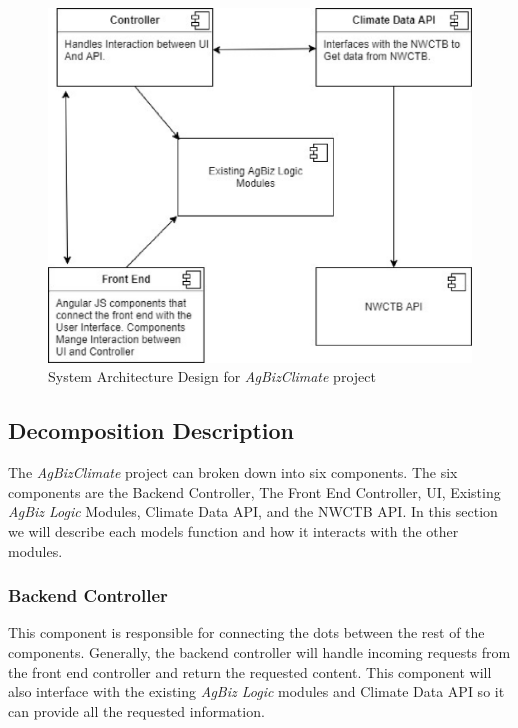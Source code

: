 \documentclass[onecolumn, draftclsnofoot,10pt, compsoc]{article}
\begin{document}
		\begin{figure}[htb]
			\begin{center}
				\includegraphics{UMLDiagrams/ArchitectureDesign.eps}
			\end{center}
			\caption{System Architecture Design for \textit{AgBizClimate} project}
			\label{fig:Arch1}
		\end{figure}


	\subsection{Decomposition Description}
		The \textit{AgBizClimate} project can broken down into six components. The six components are the Backend Controller, The Front End Controller, UI, Existing \textit{AgBiz Logic} Modules, Climate Data API, and the NWCTB API. In this section we will describe each models function and how it interacts with the other modules.\\

		\subsubsection{Backend Controller}
			This component is responsible for connecting the dots between the rest of the components. Generally, the backend controller will handle incoming requests from the front end controller and return the requested content. This component will also interface with the existing \textit{AgBiz Logic} modules and Climate Data API so it can provide all the requested information.\\
\end{document}
